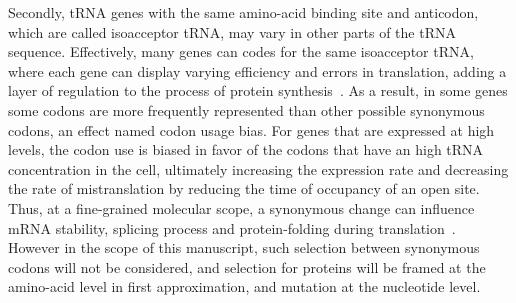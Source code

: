 Secondly, \acrshort{tRNA} genes with the same amino-acid binding site and anticodon, which are called isoacceptor \acrshort{tRNA}, may vary in other parts of the \acrshort{tRNA} sequence.
Effectively, many genes can codes for the same isoacceptor \acrshort{tRNA}, where each gene can display varying efficiency and errors in translation, adding a layer of regulation to the process of protein synthesis~\citep{Lowe1997,Chan2008,Juhling2008,Lin2019}.
As a result, in some genes some \glspl{codon} are more frequently represented than other possible synonymous \glspl{codon}, an effect named \gls{codon} usage bias.
For genes that are expressed at high levels, the \gls{codon} use is biased in favor of the \glspl{codon} that have an high \acrshort{tRNA} concentration in the cell, ultimately increasing the expression rate and decreasing the rate of mistranslation by reducing the time of occupancy of an open site.
Thus, at a fine-grained molecular scope, a synonymous change can influence mRNA stability, splicing process and protein-folding during translation~\citep{Plotkin2011, Rak2018}.
However in the scope of this manuscript, such selection between synonymous \glspl{codon} will not be considered, and selection for proteins will be framed at the amino-acid level in first approximation, and mutation at the nucleotide level.
